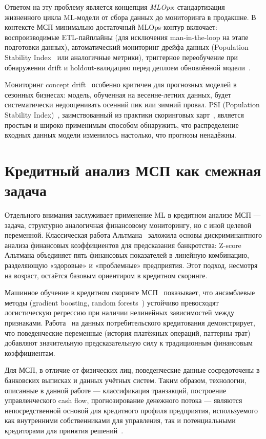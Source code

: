 Ответом на эту проблему является концепция \textit{MLOps}: стандартизация жизненного цикла ML-модели от сбора данных до мониторинга в продакшне. В контексте МСП минимально достаточный MLOps-контур включает: воспроизводимые ETL-пайплайны (для исключения man-in-the-loop на этапе подготовки данных), автоматический мониторинг дрейфа данных (Population Stability Index~\cite{siddiqi2006credit} или аналогичные метрики), триггерное переобучение при обнаружении drift и holdout-валидацию перед деплоем обновлённой модели~\cite{widmer1996learning}.

Mониторинг concept drift~\cite{widmer1996learning} особенно критичен для прогнозных моделей в сезонных бизнесах: модель, обученная на весенне-летних данных, будет систематически недооценивать осенний пик или зимний провал. PSI (Population Stability Index)~\cite{siddiqi2006credit}, заимствованный из практики скоринговых карт~\cite{khandani2010consumer}, является простым и широко применимым способом обнаружить, что распределение входных данных модели изменилось настолько, что прогнозы ненадёжны.

\section{Кредитный анализ МСП как смежная задача}

Отдельного внимания заслуживает применение ML в кредитном анализе МСП --- задача, структурно аналогичная финансовому мониторингу, но с иной целевой переменной. Классическая работа Альтмана~\cite{altman1968financial} заложила основы дискриминантного анализа финансовых коэффициентов для предсказания банкротства: Z-score Альтмана объединяет пять финансовых показателей в линейную комбинацию, разделяющую «здоровые» и «проблемные» предприятия. Этот подход, несмотря на возраст, остаётся базовым ориентиром в кредитном скоринге.

Машинное обучение в кредитном скоринге МСП~\cite{khandani2010consumer} показывает, что ансамблевые методы (gradient boosting, random forests~\cite{breiman2001random}) устойчиво превосходят логистическую регрессию при наличии нелинейных зависимостей между признаками. Работа~\cite{khandani2010consumer} на данных потребительского кредитования демонстрирует, что поведенческие переменные (история платёжных операций, паттерны трат) добавляют значительную предсказательную силу к традиционным финансовым коэффициентам.

Для МСП, в отличие от физических лиц, поведенческие данные сосредоточены в банковских выписках и данных учётных систем. Таким образом, технологии, описанные в данной работе --- классификация транзакций, построение управленческого cash flow, прогнозирование денежного потока --- являются непосредственной основой для кредитного профиля предприятия, используемого как внутренними собственниками для управления, так и потенциальными кредиторами для принятия решений~\cite{oecd2021sme}.


